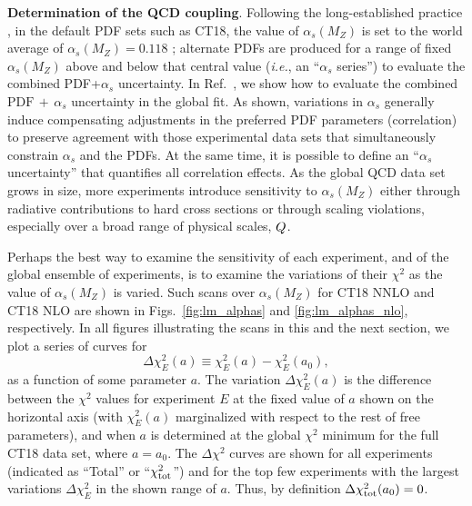 {\bf Determination of the QCD coupling}. Following the long-established practice \cite{Lai:2010nw}, in the default PDF sets such as CT18, the value of $\alpha_s(M_Z)$ is set to the world average of $\alpha_s(M_Z)\! =\! 0.118$ \cite{Tanabashi:2018oca};  alternate PDFs are produced for a range of fixed $\alpha_s(M_Z)$ above and below that central value ({\it i.e.}, an ``$\alpha_s$ series'') to evaluate the combined PDF+$\alpha_s$ uncertainty. 
%
In Ref.~\cite{Lai:2010nw}, we show how to evaluate the combined $\mathrm{PDF} \, + \, \alpha_s$ uncertainty in the global fit.
As shown, variations in $\alpha_s$ generally induce compensating adjustments in the preferred PDF parameters (correlation) 
to preserve agreement with those experimental data sets that simultaneously constrain $\alpha_s$
and the PDFs. At the same time, it is possible to define an ``$\alpha_s$ uncertainty'' that quantifies all correlation
effects.
%
As the global QCD data set grows in size, more experiments introduce sensitivity to $\alpha_s(M_Z)$ either through radiative contributions to hard cross sections or through scaling violations, especially over a broad range of physical scales, $Q$.  

Perhaps the best way to examine the sensitivity of each experiment,
and of the global ensemble of experiments, is to examine the variations
of their $\chi^2$ as the value of $\alpha_s(M_Z)$ is varied. Such
scans over $\alpha_s(M_Z)$ for CT18 NNLO and CT18 NLO are shown in
Figs.~\ref{fig:lm_alphas} and \ref{fig:lm_alphas_nlo}, respectively. In
all figures illustrating the scans in this and the next section,
we plot a series of curves for
\begin{equation}
  \Delta \chi_E^2(a) \equiv \chi_E^2(a)-\chi_E^2(a_0),
  \label{DelChi2Scan}
\end{equation}
as a function of some parameter $a$. The
variation $\Delta \chi^2_E(a)$ is the difference between the $\chi^2$
values for experiment $E$ at the fixed value of $a$ shown on the
horizontal axis (with $\chi^2_E(a)$
marginalized with respect to the rest of free
parameters), and when $a$ is determined at the global $\chi^2$ minimum
for the full CT18 data set, where $a=a_0$. The $\Delta \chi^2$ curves are
shown for all experiments (indicated as ``Total'' or
``$\chi^2_{\rm tot}$'') and for the top few experiments with the
largest variations $\Delta \chi^2_E$ in the shown range of $a$.
Thus, by definition $\Delta \chi^2_{\rm tot}(a_0) =0$.

